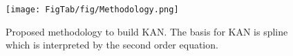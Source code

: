\begin{figure}[t]
\centering
\texttt{[image: FigTab/fig/Methodology.png]}
\vspace{-3ex}
\caption{Proposed methodology to build KAN. The basis for KAN is spline which is interpreted by the second order equation.} 
\label{fig:methodology}
\end{figure}